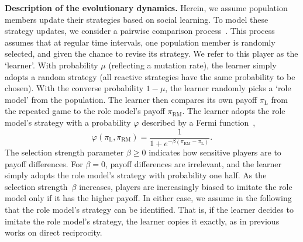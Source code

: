 \documentclass[11pt]{article}
\def\rolemodel{\text{RM}}
\def\learner{\text{L}}
\theoremstyle{plainCl1}
\theoremstyle{plainCl2}
\begin{document}
\noindent
{\bf Description of the evolutionary dynamics.}
Herein, we assume population members update their strategies based on social learning. 
To model these strategy updates, we consider a pairwise comparison process~\citep{traulsen2007pairwise}. 
This process assumes that at regular time intervals, one population member is randomly selected, and given the chance to revise its strategy.
We refer to this player as the `learner'. 
With probability $\mu$ (reflecting a mutation rate), the learner simply adopts a random strategy (all reactive strategies have the same probability to be chosen). 
With the converse probability $1\!-\!\mu$, the learner randomly picks a `role model' from the population. 
The learner then compares its own payoff $\pi_\learner$ from the repeated game to the role model's payoff $\pi_\rolemodel$. 
The learner adopts the role model's strategy with a probability \(\varphi\) described by a Fermi function~\citep{blume:GEB:1995,szabo:PRE:1998}, 
\begin{equation} \label{Eq:rho}
    \varphi\left(\pi_\learner, \pi_\rolemodel\right) = \frac{1}{1\!+\! e^{- \!\beta\left(\pi_\rolemodel- \pi_\learner\right)}}.
\end{equation}
The selection strength parameter $\beta\!\ge\!0$ indicates how sensitive players are to payoff differences. 
For $\beta\!=\!0$, payoff differences are irrelevant, and the learner simply adopts the role model's strategy with probability one half. As the selection strength~$\beta$ increases, players are increasingly biased to imitate the role model only if it has the higher payoff. 
In either case, we assume in the following that the role model's strategy can be identified.
That is, if the learner decides to imitate the role model's strategy, the learner copies it exactly, as in previous works on direct reciprocity. 

\end{document}
